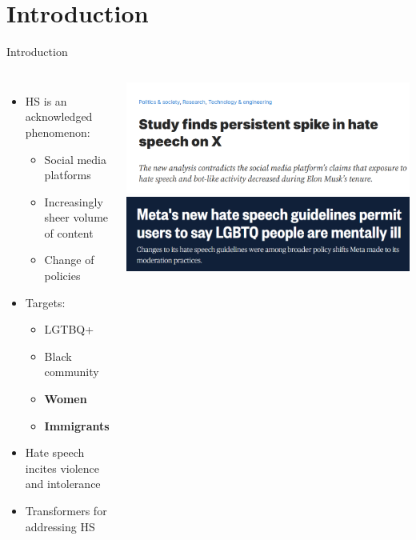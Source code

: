 \section{Introduction}
\begin{frame}{Introduction}
        \begin{columns}
            \begin{itemize}
                \item HS is an acknowledged phenomenon:
                \begin{itemize}
                    \item Social media platforms
                    \item Increasingly sheer volume of content
                    \item Change of policies
                \end{itemize}
                \item Targets:
                \begin{itemize}
                    \item LGTBQ+
                    \item Black community
                    \item \textbf{Women}
                    \item \textbf{Immigrants}
                \end{itemize} 
                \item Hate speech incites violence and intolerance
                \item Transformers for addressing HS
            \end{itemize}
                \includegraphics[width=\textwidth]{images/x_hate.PNG}
                \vfill
                \includegraphics[width=\textwidth]{images/meta_new_policy.PNG}

\end{columns}
\end{frame}
